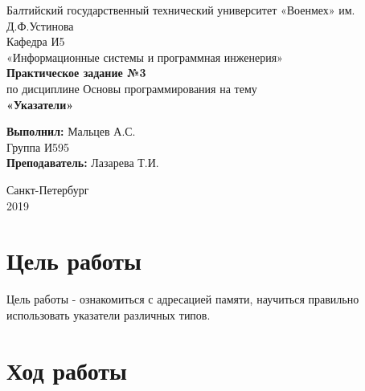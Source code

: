 \documentclass[a4paper,14pt]{extarticle}
\begin{document}
\begin{titlepage}
\centering
\small Балтийский государственный технический университет «Военмех» им. Д.Ф.Устинова \\
\vspace{3cm}
\normalsize Кафедра И5\\
«Информационные системы и программная инженерия»\\
\vspace{3cm}
\textbf{Практическое задание №3}\\
по дисциплине Основы программирования на тему\\ 
\textbf{«Указатели»}\\
\vfill

\begin{flushleft}
\textbf{Выполнил:}
\hfill {Мальцев А.С.} \\
\hfill {Группа И595} \\
\vspace{1cm}
\textbf{Преподаватель:}
\hfill {Лазарева Т.И.} \\
\end{flushleft}
\vspace{3cm}

{\centering Санкт-Петербург \\ 
\vspace{0.15cm}
2019}
\end{titlepage}

\section{Цель работы}
Цель работы - ознакомиться с адресацией памяти, научиться правильно использовать указатели различных типов.
\setcounter{page}{2}

\section{Ход работы}
\end{document}
